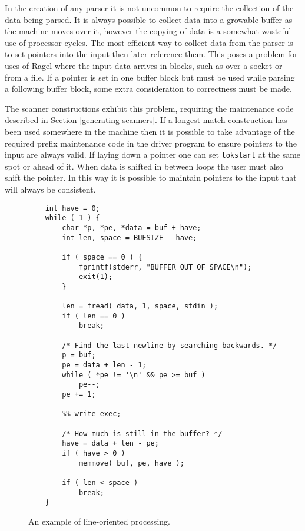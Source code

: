 \documentclass[letterpaper,11pt,oneside]{book}
\begin{document}
In the creation of any parser it is not uncommon to require the collection of
the data being parsed.  It is always possible to collect data into a growable
buffer as the machine moves over it, however the copying of data is a somewhat
wasteful use of processor cycles. The most efficient way to collect data from
the parser is to set pointers into the input then later reference them.  This
poses a problem for uses of Ragel where the input data arrives in blocks, such
as over a socket or from a file. If a pointer is set in one buffer block but
must be used while parsing a following buffer block, some extra consideration
to correctness must be made.

The scanner constructions exhibit this problem, requiring the maintenance
code described in Section \ref{generating-scanners}. If a longest-match
construction has been used somewhere in the machine then it is possible to
take advantage of the required prefix maintenance code in the driver program to
ensure pointers to the input are always valid. If laying down a pointer one can
set \verb|tokstart| at the same spot or ahead of it. When data is shifted in
between loops the user must also shift the pointer.  In this way it is possible
to maintain pointers to the input that will always be consistent.

\begin{figure}
\small
\begin{verbatim}
    int have = 0;
    while ( 1 ) {
        char *p, *pe, *data = buf + have;
        int len, space = BUFSIZE - have;

        if ( space == 0 ) { 
            fprintf(stderr, "BUFFER OUT OF SPACE\n");
            exit(1);
        }

        len = fread( data, 1, space, stdin );
        if ( len == 0 )
            break;

        /* Find the last newline by searching backwards. */
        p = buf;
        pe = data + len - 1;
        while ( *pe != '\n' && pe >= buf )
            pe--;
        pe += 1;

        %% write exec;

        /* How much is still in the buffer? */
        have = data + len - pe;
        if ( have > 0 )
            memmove( buf, pe, have );

        if ( len < space )
            break;
    }
\end{verbatim}
\caption{An example of line-oriented processing.}
\label{line-oriented}
\end{figure}
\end{document}
